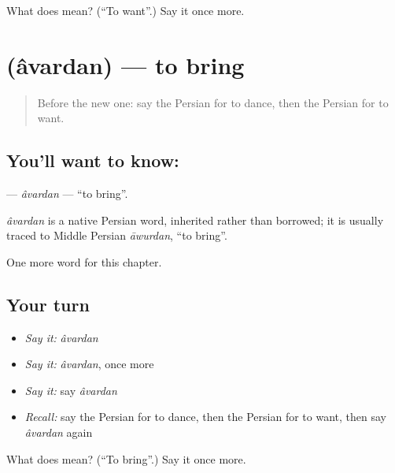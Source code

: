\begin{tcolorbox}[breakable,colback=teal!4,colframe=teal!35!black,title={Before you move on}]
What does  mean? (\textquotedblleft{}To want\textquotedblright{}.) Say it once more.
\end{tcolorbox}
\section[\texorpdfstring{\fa{آوردن} (âvardan)}{آوردن (âvardan)}]{ (âvardan) — to bring}

\label{lesson:FA-C38-avardan}



\begin{quote}
Before the new one: say the Persian for to dance, then the Persian for to want.
\end{quote}

\subsection*{You'll want to know: }
\textbf{} — \emph{âvardan} — \textquotedblleft{}to bring\textquotedblright{}.

\begin{cousinweb}
\emph{âvardan} is a native Persian word, inherited rather than borrowed; it is usually traced to Middle Persian \emph{āwurdan}, \textquotedblleft{}to bring\textquotedblright{}.
\end{cousinweb}

\begin{grammarlens}[title={What you've built}]
One more word for this chapter.
\end{grammarlens}

\subsection*{Your turn}
\begin{itemize}
\raggedright
  \item \emph{Say it:} \emph{âvardan}
  \item \emph{Say it:} \emph{âvardan}, once more
  \item \emph{Say it:} say \emph{âvardan}
  \item \emph{Recall:} say the Persian for to dance, then the Persian for to want, then say \emph{âvardan} again
\end{itemize}

\begin{tcolorbox}[breakable,colback=teal!4,colframe=teal!35!black,title={Before you move on}]
What does  mean? (\textquotedblleft{}To bring\textquotedblright{}.) Say it once more.
\end{tcolorbox}
